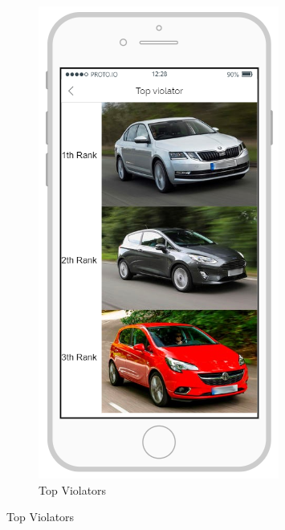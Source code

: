 \documentclass{article}
\begin{document}
\begin{figure}[h]
			\begin{subfigure}[h]{0.49\linewidth}
				\includegraphics[width=\linewidth]{images/Top_Violators.png}
				\caption{Top Violators}
			\end{subfigure}
		\end{figure}			
	\FloatBarrier
\end{document}
